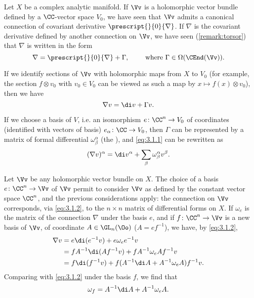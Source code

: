 \begin{para}
  Let $X$ be a complex analytic manifold. If $\Vv$ is a holomorphic vector
  bundle defined by a $\CC$-vector space $V_0$, we have seen that $\Vv$ admits
  a canonical connection of covariant derivative $\prescript{}{0}{\nabla}$.
  If $\nabla$ is the covariant derivative defined by another connection on $\Vv$,
  we have seen (\ref{remark:torsor}) that $\nabla$ is written in the form
  \[
  \nabla = \prescript{}{0}{\nabla}+\Gamma,\qquad
  \text{ where }\Gamma\in\Omega(\CEnd(\Vv)).
  \]

  If we identify sections of $\Vv$ with holomorphic maps from $X$ to $V_0$
  (for example, the section $f\otimes v_0$ with $v_0\in V_0$ can be viewed as
  such a map by $x\mapsto f(x)\otimes v_0$),
  then we have
  \begin{equation}\label{eq:3.1.1}
    \nabla v = \di v + \Gamma v.
  \end{equation}

  If we choose a basis of $V$, i.e. an isomorphism $e\colon \CC^n\to V_0$ of
  coordinates (identified with vectors of basis) $e_\alpha\colon\CC\to V_0$,
  then $\Gamma$ can be represented by a matrix of formal differential
  $\omega^\alpha_\beta$ (the ), and
  \cref{eq:3.1.1} can be rewritten as
  \begin{equation}\label{eq:3.1.2}
    (\nabla v)^\alpha = \di v^\alpha + \sum_\beta\omega^\alpha_\beta v^\beta.
  \end{equation}

  Let $\Vv$ be any holomorphic vector bundle on $X$. The choice of a basis
  $e\colon\CC^n\to\Vv$ of $\Vv$ permit to consider $\Vv$ as defined by the
  constant vector space $\CC^n$, and the previous considerations apply:
  the connection on $\Vv$ corresponds, via \cref{eq:3.1.2}, to the $n\times n$
  matrix of differential forms on $X$.
  If $\omega_e$ is the matrix of the connection $\nabla$ under the basis $e$,
  and if $f\colon\CC^n\to\Vv$ is a new basis of $\Vv$, of coordinate
  $A\in\GL_n(\Oo)$ ($A=ef^{-1}$), we have, by \cref{eq:3.1.2},
  \begin{align*}
    \nabla v &= e\di(e^{-1}v) + e\omega_ee^{-1}v \\
    &= fA^{-1}\di(Af^{-1}v) + fA^{-1}\omega_eAf^{-1}v \\
    &= f\di(f^{-1}v) + f(A^{-1}\di A + A^{-1}\omega_eA)f^{-1}v.
  \end{align*}
  Comparing with \cref{eq:3.1.2} under the basis $f$, we find that
  \begin{equation}\label{eq:3.1.3}
    \omega_f = A^{-1}\di A + A^{-1}\omega_eA.
  \end{equation}


\end{para}
